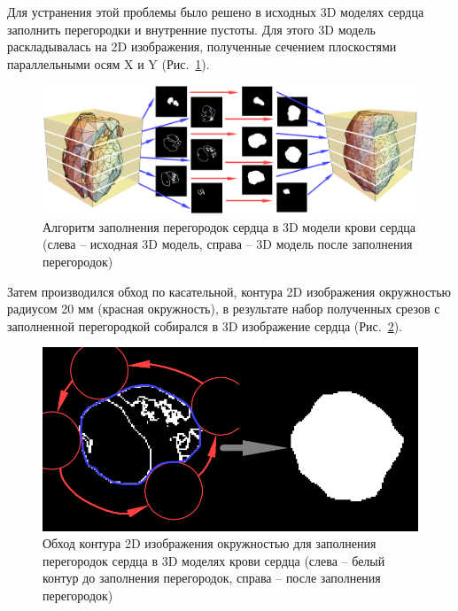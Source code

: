 \documentclass[conference]{IEEEtran}
\begin{document}
Для устранения этой проблемы было решено в исходных 3D моделях сердца заполнить перегородки и внутренние пустоты.
Для этого 3D модель раскладывалась на 2D изображения, полученные сечением плоскостями параллельными осям X и Y (Рис.~\ref{fig:algo}).

\begin{figure}[tbph]
    \centering
    \includegraphics[width=\linewidth]{fig/algo}
    \caption{Алгоритм заполнения перегородок сердца в 3D модели крови сердца (слева –
    исходная 3D модель, справа – 3D модель после заполнения перегородок)}
    \label{fig:algo}
\end{figure}

Затем производился обход по касательной, контура 2D изображения окружностью радиусом
20 мм (красная окружность), в результате набор полученных срезов с заполненной перегородкой собирался в 3D изображение сердца (Рис.~\ref{fig:algo2}).

\begin{figure}[tbph]
    \centering
    \includegraphics[width=\linewidth]{fig/algo2}
    \caption{Обход контура 2D изображения окружностью для заполнения перегородок
    сердца в 3D моделях крови сердца (слева – белый контур до заполнения перегородок,
        справа – после заполнения перегородок)}
    \label{fig:algo2}
\end{figure}
\end{document}

